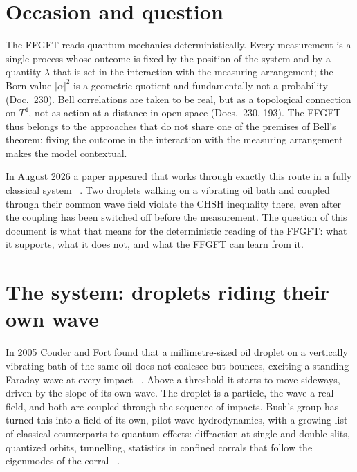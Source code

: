 \section{Occasion and question}

The FFGFT reads quantum mechanics deterministically. Every measurement is a single process whose
outcome is fixed by the position of the system and by a quantity $\lambda$ that is set in the
interaction with the measuring arrangement; the Born value $|\alpha|^2$ is a geometric quotient and
fundamentally not a probability (Doc.~230). Bell correlations are taken to be real, but as a
topological connection on $T^4$, not as action at a distance in open space (Docs.~230, 193). The
FFGFT thus belongs to the approaches that do not share one of the premises of Bell's theorem: fixing
the outcome in the interaction with the measuring arrangement makes the model contextual.

In August 2026 a paper appeared that works through exactly this route in a fully classical system
\QM~\cite{Lopez2026}. Two droplets walking on a vibrating oil bath and coupled through their common
wave field violate the CHSH inequality there, even after the coupling has been switched off before the
measurement. The question of this document is what that means for the deterministic reading of the
FFGFT: what it supports, what it does not, and what the FFGFT can learn from it.

\section{The system: droplets riding their own wave}

In 2005 Couder and Fort found that a millimetre-sized oil droplet on a vertically vibrating bath of
the same oil does not coalesce but bounces, exciting a standing Faraday wave at every impact
\QM~\cite{Couder2005}. Above a threshold it starts to move sideways, driven by the slope of its own
wave. The droplet is a particle, the wave a real field, and both are coupled through the sequence of
impacts. Bush's group has turned this into a field of its own, pilot-wave hydrodynamics, with a
growing list of classical counterparts to quantum effects: diffraction at single and double slits,
quantized orbits, tunnelling, statistics in confined corrals that follow the eigenmodes of the corral
\QM~\cite{BushOza2021}.

